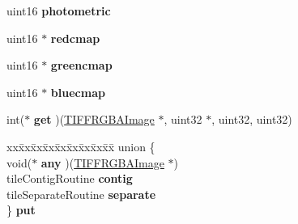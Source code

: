 \begin{DoxyCompactItemize}
uint16 {\bfseries photometric}
\item 
\mbox{\label{struct__TIFFRGBAImage_a0b5f594922f3d979ba8079a360b1dfae}} 
uint16 $\ast$ {\bfseries redcmap}
\item 
\mbox{\label{struct__TIFFRGBAImage_a362e70f619c5212713ab0feec89e18ae}} 
uint16 $\ast$ {\bfseries greencmap}
\item 
\mbox{\label{struct__TIFFRGBAImage_abf804fa59213f3fdbfc4a197632517a2}} 
uint16 $\ast$ {\bfseries bluecmap}
\item 
\mbox{\label{struct__TIFFRGBAImage_a9ecda6cb78335d270295ad41aaf8437c}} 
int($\ast$ {\bfseries get} )(\hyperlink{struct__TIFFRGBAImage}{T\+I\+F\+F\+R\+G\+B\+A\+Image} $\ast$, uint32 $\ast$, uint32, uint32)
\item 
\mbox{\label{struct__TIFFRGBAImage_a6539a7c83740490093dd50631d2a8e05}} 
\begin{tabbing}
xx\=xx\=xx\=xx\=xx\=xx\=xx\=xx\=xx\=\kill
union \{\\
\>void($\ast$ {\bfseries any} )(\hyperlink{struct__TIFFRGBAImage}{TIFFRGBAImage} $\ast$)\\
\>tileContigRoutine {\bfseries contig}\\
\>tileSeparateRoutine {\bfseries separate}\\
\} {\bfseries put}\\


\end{tabbing}
\end{DoxyCompactItemize}
